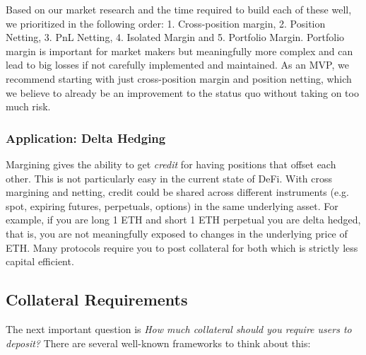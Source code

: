 \documentclass{article}
\begin{document}
\noindent Based on our market research and the time required to build each of these well, we prioritized in the following order: 1. Cross-position margin, 2. Position Netting, 3. PnL Netting, 4. Isolated Margin and 5. Portfolio Margin. Portfolio margin is important for market makers but meaningfully more complex and can lead to big losses if not carefully implemented and maintained. 
As an MVP, we recommend starting with just cross-position margin and position netting, which we believe to already be an improvement to the status quo without taking on too much risk. 

\subsubsection{Application: Delta Hedging} 

\noindent Margining gives the ability to get \textit{credit} for having positions that offset each other. This is not particularly easy in the current state of DeFi. With cross margining and netting, credit could be shared across different instruments (e.g. spot, expiring futures, perpetuals, options) in the same underlying asset. For example, if you are long 1 ETH and short 1 ETH perpetual you are delta hedged, that is, you are not meaningfully exposed to changes in the underlying price of ETH. Many protocols require you to post collateral for both which is strictly less capital efficient.


\subsection{Collateral Requirements}
\label{sec:collateralreqs}

\noindent The next important question is \textit{How much collateral should you require users to deposit?} There are several well-known frameworks to think about this: 
\end{document}
